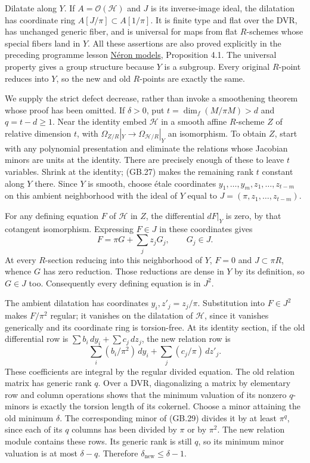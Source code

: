 \documentclass[
  11pt,
]{article}
\begin{document}
Dilatate along \(Y\). If \(A=\mathcal O(\mathcal H)\) and \(J\) is its
inverse-image ideal, the dilatation has coordinate ring
\(A[J/\pi]\subset A[1/\pi]\). It is finite type and flat over the DVR,
has unchanged generic fiber, and is universal for maps from flat
\(R\)-schemes whose special fibers land in \(Y\). All these assertions
are also proved explicitly in the preceding programme lesson
\href{../AG-GS/AG-GS-07.html}{Néron models}, Proposition 4.1. The
universal property gives a group structure because \(Y\) is a subgroup.
Every original \(R\)-point reduces into \(Y\), so the new and old
\(R\)-points are exactly the same.

We supply the strict defect decrease, rather than invoke a smoothening
theorem whose proof has been omitted. If \(\delta>0\), put
\(t=\dim_f(M/\pi M)>d\) and \(q=t-d\geq1\). Near the identity embed
\(\mathcal H\) in a smooth affine \(R\)-scheme \(Z\) of relative
dimension \(t\), with \(\Omega_{Z/R}|_Y\to\Omega_{\mathcal H/R}|_Y\) an
isomorphism. To obtain \(Z\), start with any polynomial presentation and
eliminate the relations whose Jacobian minors are units at the identity.
There are precisely enough of these to leave \(t\) variables. Shrink at
the identity; (GB.27) makes the remaining rank \(t\) constant along
\(Y\) there. Since \(Y\) is smooth, choose étale coordinates
\(y_1,\ldots,y_m,z_1,\ldots,z_{t-m}\) on this ambient neighborhood with
the ideal of \(Y\) equal to \(J=(\pi,z_1,\ldots,z_{t-m})\).

For any defining equation \(F\) of \(\mathcal H\) in \(Z\), the
differential \(dF|_Y\) is zero, by that cotangent isomorphism.
Expressing \(F\in J\) in these coordinates gives \[
 F=\pi G+\sum_j z_jG_j,\qquad G_j\in J.
 \tag{GB.28}
\] At every \(R\)-section reducing into this neighborhood of \(Y\),
\(F=0\) and \(J\subset\pi R\), whence \(G\) has zero reduction. Those
reductions are dense in \(Y\) by its definition, so \(G\in J\) too.
Consequently every defining equation is in \(J^2\).

The ambient dilatation has coordinates \(y_i,z'_j=z_j/\pi\).
Substitution into \(F\in J^2\) makes \(F/\pi^2\) regular; it vanishes on
the dilatation of \(\mathcal H\), since it vanishes generically and its
coordinate ring is torsion-free. At its identity section, if the old
differential row is \(\sum b_i\,dy_i+\sum c_j\,dz_j\), the new relation
row is \[
 \sum_i(b_i/\pi^2)\,dy_i+\sum_j(c_j/\pi)\,dz'_j.
 \tag{GB.29}
\] These coefficients are integral by the regular divided equation. The
old relation matrix has generic rank \(q\). Over a DVR, diagonalizing a
matrix by elementary row and column operations shows that the minimum
valuation of its nonzero \(q\)-minors is exactly the torsion length of
its cokernel. Choose a minor attaining the old minimum \(\delta\). The
corresponding minor of (GB.29) divides it by at least \(\pi^q\), since
each of its \(q\) columns has been divided by \(\pi\) or by \(\pi^2\).
The new relation module contains these rows. Its generic rank is still
\(q\), so its minimum minor valuation is at most \(\delta-q\). Therefore
\(\delta_{\mathrm{new}}\leq\delta-1\).
\end{document}

